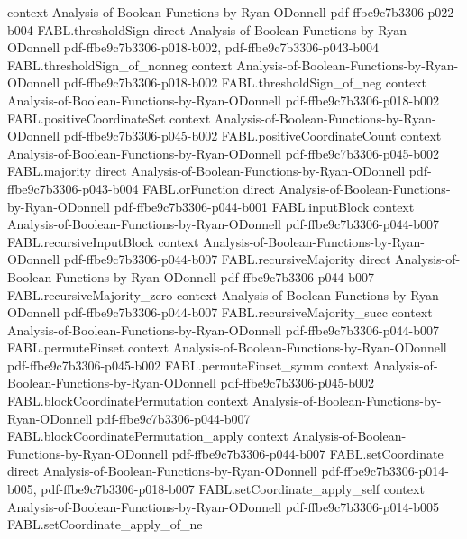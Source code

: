 \begin{theorem}
  {context}
  {Analysis-of-Boolean-Functions-by-Ryan-ODonnell}
  {pdf-ffbe9c7b3306-p022-b004}
\proofstep
  {FABL.thresholdSign}
  {direct}
  {Analysis-of-Boolean-Functions-by-Ryan-ODonnell}
  {pdf-ffbe9c7b3306-p018-b002,
    pdf-ffbe9c7b3306-p043-b004}
\proofstep
  {FABL.thresholdSign_of_nonneg}
  {context}
  {Analysis-of-Boolean-Functions-by-Ryan-ODonnell}
  {pdf-ffbe9c7b3306-p018-b002}
\proofstep
  {FABL.thresholdSign_of_neg}
  {context}
  {Analysis-of-Boolean-Functions-by-Ryan-ODonnell}
  {pdf-ffbe9c7b3306-p018-b002}
\proofstep
  {FABL.positiveCoordinateSet}
  {context}
  {Analysis-of-Boolean-Functions-by-Ryan-ODonnell}
  {pdf-ffbe9c7b3306-p045-b002}
\proofstep
  {FABL.positiveCoordinateCount}
  {context}
  {Analysis-of-Boolean-Functions-by-Ryan-ODonnell}
  {pdf-ffbe9c7b3306-p045-b002}
\proofstep
  {FABL.majority}
  {direct}
  {Analysis-of-Boolean-Functions-by-Ryan-ODonnell}
  {pdf-ffbe9c7b3306-p043-b004}
\proofstep
  {FABL.orFunction}
  {direct}
  {Analysis-of-Boolean-Functions-by-Ryan-ODonnell}
  {pdf-ffbe9c7b3306-p044-b001}
\proofstep
  {FABL.inputBlock}
  {context}
  {Analysis-of-Boolean-Functions-by-Ryan-ODonnell}
  {pdf-ffbe9c7b3306-p044-b007}
\proofstep
  {FABL.recursiveInputBlock}
  {context}
  {Analysis-of-Boolean-Functions-by-Ryan-ODonnell}
  {pdf-ffbe9c7b3306-p044-b007}
\proofstep
  {FABL.recursiveMajority}
  {direct}
  {Analysis-of-Boolean-Functions-by-Ryan-ODonnell}
  {pdf-ffbe9c7b3306-p044-b007}
\proofstep
  {FABL.recursiveMajority_zero}
  {context}
  {Analysis-of-Boolean-Functions-by-Ryan-ODonnell}
  {pdf-ffbe9c7b3306-p044-b007}
\proofstep
  {FABL.recursiveMajority_succ}
  {context}
  {Analysis-of-Boolean-Functions-by-Ryan-ODonnell}
  {pdf-ffbe9c7b3306-p044-b007}
\proofstep
  {FABL.permuteFinset}
  {context}
  {Analysis-of-Boolean-Functions-by-Ryan-ODonnell}
  {pdf-ffbe9c7b3306-p045-b002}
\proofstep
  {FABL.permuteFinset_symm}
  {context}
  {Analysis-of-Boolean-Functions-by-Ryan-ODonnell}
  {pdf-ffbe9c7b3306-p045-b002}
\proofstep
  {FABL.blockCoordinatePermutation}
  {context}
  {Analysis-of-Boolean-Functions-by-Ryan-ODonnell}
  {pdf-ffbe9c7b3306-p044-b007}
\proofstep
  {FABL.blockCoordinatePermutation_apply}
  {context}
  {Analysis-of-Boolean-Functions-by-Ryan-ODonnell}
  {pdf-ffbe9c7b3306-p044-b007}
\proofstep
  {FABL.setCoordinate}
  {direct}
  {Analysis-of-Boolean-Functions-by-Ryan-ODonnell}
  {pdf-ffbe9c7b3306-p014-b005,
    pdf-ffbe9c7b3306-p018-b007}
\proofstep
  {FABL.setCoordinate_apply_self}
  {context}
  {Analysis-of-Boolean-Functions-by-Ryan-ODonnell}
  {pdf-ffbe9c7b3306-p014-b005}
\proofstep
  {FABL.setCoordinate_apply_of_ne}

\end{theorem}

